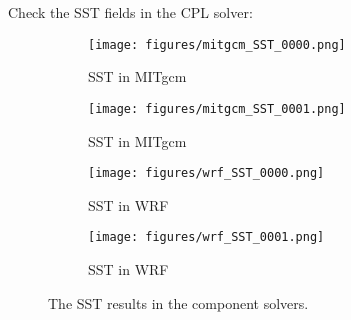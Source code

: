 
Check the SST fields in the CPL solver:

\begin{figure}[h!]
\centering
  \begin{subfigure}[b]{0.45\linewidth}
  \texttt{[image: figures/mitgcm\_SST\_0000.png]}
  \caption{SST in MITgcm}
  \end{subfigure}
  \begin{subfigure}[b]{0.45\linewidth}
  \texttt{[image: figures/mitgcm\_SST\_0001.png]}
  \caption{SST in MITgcm}
  \end{subfigure}
  \hspace{0.1in}
  \begin{subfigure}[b]{0.45\linewidth}
  \texttt{[image: figures/wrf\_SST\_0000.png]}
  \caption{SST in WRF}
  \end{subfigure}
  \begin{subfigure}[b]{0.45\linewidth}
  \texttt{[image: figures/wrf\_SST\_0001.png]}
  \caption{SST in WRF}
  \end{subfigure}
\caption{The SST results in the component solvers.}
\label{fig:sst}
\end{figure}
